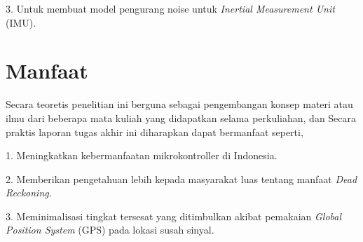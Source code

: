 3. Untuk membuat model pengurang noise untuk \emph{Inertial Measurement Unit} (IMU).

\section{Manfaat}

Secara teoretis penelitian ini berguna sebagai pengembangan konsep materi atau ilmu dari beberapa mata kuliah yang didapatkan selama perkuliahan, 
dan Secara praktis laporan tugas akhir ini diharapkan dapat bermanfaat seperti,

1. Meningkatkan kebermanfaatan mikrokontroller di Indonesia.

2. Memberikan pengetahuan lebih kepada masyarakat luas tentang manfaat \emph{Dead Reckoning}.

3. Meminimalisasi tingkat tersesat yang ditimbulkan akibat pemakaian 
\emph{Global Position System} (GPS) pada lokasi susah sinyal.
